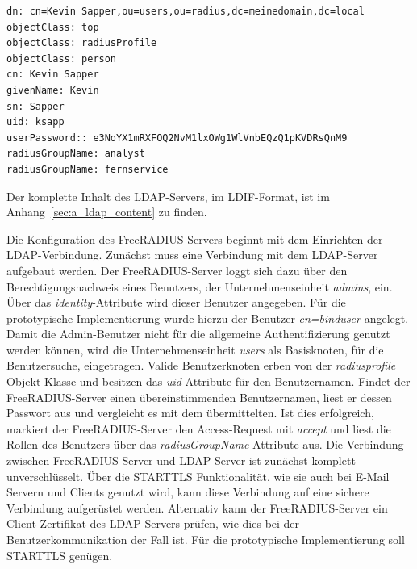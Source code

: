 \documentclass[11pt,a4paper]{report}
\begin{document}
\begin{lstlisting}[caption={Benutzerbeschreibung im LDIF-Format},label=lst:ldif_user]
dn: cn=Kevin Sapper,ou=users,ou=radius,dc=meinedomain,dc=local
objectClass: top
objectClass: radiusProfile
objectClass: person
cn: Kevin Sapper
givenName: Kevin
sn: Sapper
uid: ksapp
userPassword:: e3NoYX1mRXFOQ2NvM1lxOWg1WlVnbEQzQ1pKVDRsQnM9
radiusGroupName: analyst
radiusGroupName: fernservice
\end{lstlisting}

Der komplette Inhalt des LDAP-Servers, im LDIF-Format, ist im Anhang~\ref{sec:a_ldap_content} zu finden. 

Die Konfiguration des FreeRADIUS-Servers beginnt mit dem Einrichten der LDAP-Verbindung. Zunächst muss eine Verbindung mit dem LDAP-Server aufgebaut werden. Der FreeRADIUS-Server loggt sich dazu über den Berechtigungsnachweis eines Benutzers, der Unternehmenseinheit \textit{admins}, ein. Über das \textit{identity}-Attribute wird dieser Benutzer angegeben. Für die prototypische Implementierung wurde hierzu der Benutzer \textit{cn=binduser} angelegt. Damit die Admin-Benutzer nicht für die allgemeine Authentifizierung genutzt werden können, wird die Unternehmenseinheit \textit{users} als Basisknoten, für die Benutzersuche, eingetragen. Valide Benutzerknoten erben von der \textit{radiusprofile} Objekt-Klasse und besitzen das \textit{uid}-Attribute für den Benutzernamen. Findet der FreeRADIUS-Server einen übereinstimmenden Benutzernamen, liest er dessen Passwort aus und vergleicht es mit dem übermittelten. Ist dies erfolgreich, markiert der FreeRADIUS-Server den Access-Request mit \textit{accept} und liest die Rollen des Benutzers über das \textit{radiusGroupName}-Attribute aus. Die Verbindung zwischen FreeRADIUS-Server und LDAP-Server ist zunächst komplett unverschlüsselt. Über die STARTTLS Funktionalität, wie sie auch bei E-Mail Servern und Clients genutzt wird, kann diese Verbindung auf eine sichere Verbindung aufgerüstet werden. Alternativ kann der FreeRADIUS-Server ein Client-Zertifikat des LDAP-Servers prüfen, wie dies bei der Benutzerkommunikation der Fall ist. Für die prototypische Implementierung soll STARTTLS genügen.
\end{document}
